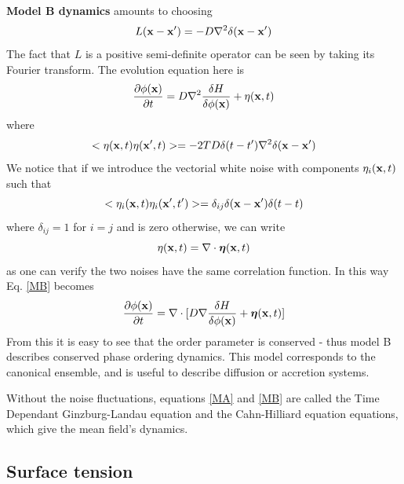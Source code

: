 \textbf{Model B dynamics} amounts to choosing
\begin{equation}
L({\bf x}-{\bf x}')= -D\nabla^2 \delta({\bf x}-{\bf x'})
\end{equation}
The fact that $L$ is a positive semi-definite operator can be seen by taking its Fourier transform. The evolution equation here is
\begin{equation}
\frac{\partial \phi({\bf x})}{\partial t}= D\nabla^2 \frac{\delta H}{\delta \phi({\bf x})} + \eta({\bf x},t)
\label{MB}
\end{equation}
where
\begin{equation}
< \eta({\bf x},t)\eta({\bf x}',t)> =-2TD \delta(t-t')\nabla^2\delta({\bf x}-{\bf x'})
\end{equation}
We notice that if we introduce the vectorial white noise with components $\eta_i({\bf x},t)$ such that
\begin{equation}
< \eta_i({\bf x},t) \eta_i({\bf x}',t')> =\delta_{ij} \delta({\bf x}-{\bf x'})\delta(t-t)
\end{equation}
where $\delta_{ij}=1$ for $i=j$ and is zero otherwise, we can write
\begin{equation}
\eta({\bf x},t)= \nabla\cdot {\boldsymbol \eta}({\bf x},t)
\end{equation}
as one can verify the two noises have the same correlation function. In this way Eq. \eqref{MB} becomes 
\begin{equation}
\frac{\partial \phi({\bf x})}{\partial t}= \nabla\cdot[ D\nabla \frac{\delta H}{\delta \phi({\bf x})} + {\boldsymbol\eta}({\bf x},t)]
\end{equation}
From this it is easy to see that the order parameter is conserved - thus model B describes conserved phase ordering dynamics. This model corresponds to the canonical ensemble, and is useful to describe diffusion or accretion systems.

Without the noise fluctuations, equations \eqref{MA} and \eqref{MB} are called the Time Dependant Ginzburg-Landau equation \cite{tuszynski_exact_1984} and the Cahn-Hilliard equation\cite{cahn_free_1958} equations, which give the mean field's dynamics.


\subsection{Surface tension}

